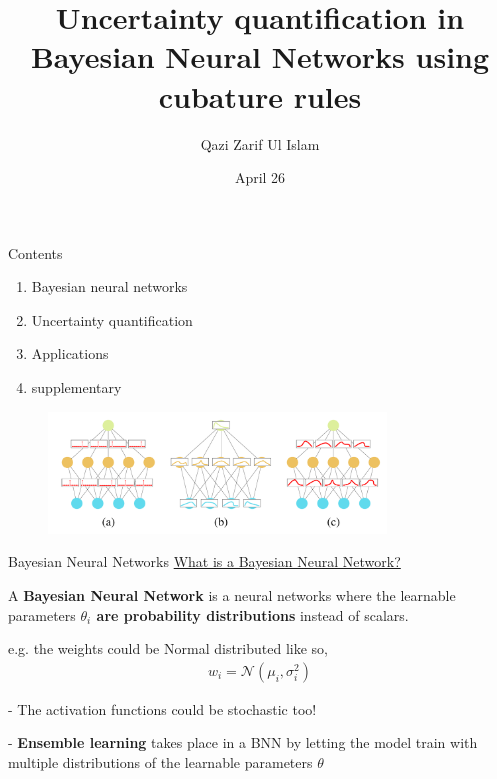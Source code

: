\documentclass[11pt, aspectratio=169]{beamer}
\title{Uncertainty quantification in Bayesian Neural Networks using cubature rules}
\author{Qazi Zarif Ul Islam}
\date{April 26}
\begin{document}
\maketitle

\begin{frame}
    {Contents}
    \begin{enumerate}
        \item Bayesian neural networks
        \item Uncertainty quantification
        \item Applications
        \item supplementary
    \end{enumerate}
\end{frame}

\begin{frame}
    \begin{figure}
        \centering
        \includegraphics[width=0.8\textwidth]{figs/BNN.png}
    \end{figure}
\end{frame}

\begin{frame}{Bayesian Neural Networks}
    \underline{What is a Bayesian Neural Network?}

    A \textbf<overlay specification>{Bayesian Neural Network} is a neural networks
    where the learnable parameters \textbf{$\theta_i$ are probability distributions}
    instead of scalars.

    e.g. the weights could be Normal distributed like so,
    \begin{align}
        w_i = \mathcal{N}(\mu_i, \sigma_i^2)
    \end{align}

    - The activation functions could be stochastic too!

    - \textbf{Ensemble learning} takes place in a BNN by letting the model 
    train with multiple distributions of the learnable parameters $\theta$



\end{frame}
\end{document}
